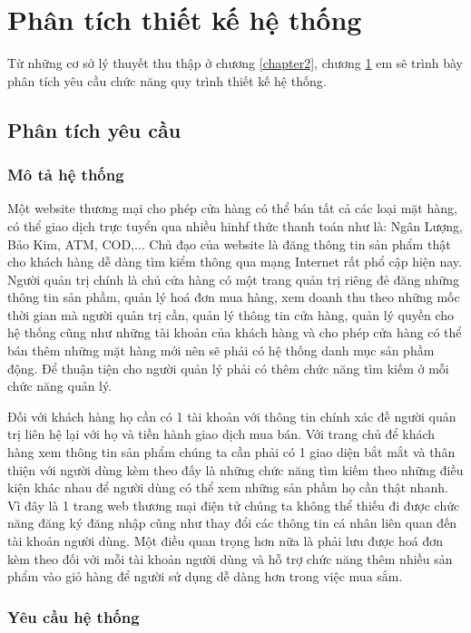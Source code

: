 \chapter{Phân tích thiết kế hệ thống}
\label{chapter3}
Từ những cơ sở lý thuyết thu thập ở chương \ref{chapter2}, chương \ref{chapter3} em sẽ trình bày phân tích yêu cầu chức năng quy trình thiết kế hệ thống.
\section{Phân tích yêu cầu}
\subsection{Mô tả hệ thống}
Một website thương mại cho phép cửa hàng có thể bán tất cả các loại mặt hàng, có thể giao dịch trực tuyển qua nhiều hinhf thức thanh toán như là: Ngân Lượng, Bảo Kim, ATM, COD,...
Chủ đạo của website là đăng thông tin sản phẩm thật cho khách hàng dễ dàng tìm kiểm thông qua mạng Internet rất phổ cập hiện nay. Người quản trị chính là chủ cửa hàng có một trang quản trị riêng đẻ đăng những thông tin sản phầm, quản lý hoá đơn mua hàng, xem doanh thu theo những mốc thời gian mà người quản trị cần, quản lý thông tin cửa hàng, quản lý quyền cho hệ thống cũng như những tài khoản của khách hàng và cho phép cửa hàng có thể bán thêm những mặt hàng mới nên sẽ phải có hệ thống danh mục sản phầm động. Để thuận tiện cho người quản lý phải có thêm chức năng tìm kiếm ở mỗi chức năng quản lý.
\par
Đối với khách hàng họ cần có 1 tài khoản với thông tin chính xác đề người quản trị liên hệ lại với họ và tiền hành giao dịch mua bán. Với trang chủ để khách hàng xem thông tin sản phẩm chúng ta cần phải có 1 giao diện bắt mắt và thân thiện với người dùng kèm theo đấy là những chức năng tìm kiếm theo những điều kiện khác nhau để người dùng có thể xem những sản phầm họ cần thật nhanh. Vì đây là 1 trang web thương mại điện tử chúng ta không thể thiếu đi được chức năng đăng ký đăng nhập cũng như thay đổi các thông tin cá nhân liên quan đến tài khoản người dùng. Một điều quan trọng hơn nữa là phải lưu được hoá đơn kèm theo đối với mỗi tài khoản người dùng và hỗ trợ chức năng thêm nhiều sản phẩm vào giỏ hàng để người sử dụng dễ dàng hơn trong việc mua sắm.
\subsection{Yêu cầu hệ thống}
